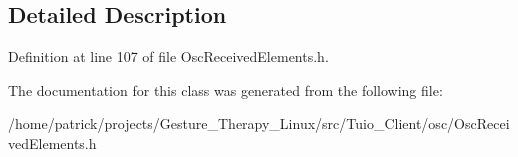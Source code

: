 \subsection{Detailed Description}


Definition at line 107 of file Osc\+Received\+Elements.\+h.



The documentation for this class was generated from the following file\+:\begin{DoxyCompactItemize}
\item 
/home/patrick/projects/\+Gesture\+\_\+\+Therapy\+\_\+\+Linux/src/\+Tuio\+\_\+\+Client/osc/Osc\+Received\+Elements.\+h\end{DoxyCompactItemize}
